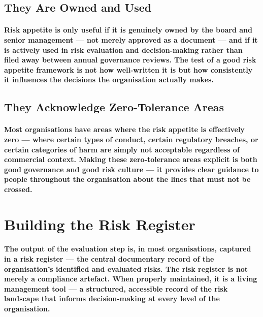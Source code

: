 \subsection{They Are Owned and Used}
\paragraph{Risk appetite is only useful if it is genuinely owned by the board and senior management — not merely approved as a document — and if it is actively used in risk evaluation and decision-making rather than filed away between annual governance reviews. The test of a good risk appetite framework is not how well-written it is but how consistently it influences the decisions the organisation actually makes.}

\subsection{They Acknowledge Zero-Tolerance Areas}
\paragraph{Most organisations have areas where the risk appetite is effectively zero — where certain types of conduct, certain regulatory breaches, or certain categories of harm are simply not acceptable regardless of commercial context. Making these zero-tolerance areas explicit is both good governance and good risk culture — it provides clear guidance to people throughout the organisation about the lines that must not be crossed.}

\section{Building the Risk Register}
\paragraph{The output of the evaluation step is, in most organisations, captured in a \textbf{risk register} — the central documentary record of the organisation's identified and evaluated risks. The risk register is not merely a compliance artefact. When properly maintained, it is a living management tool — a structured, accessible record of the risk landscape that informs decision-making at every level of the organisation.}
